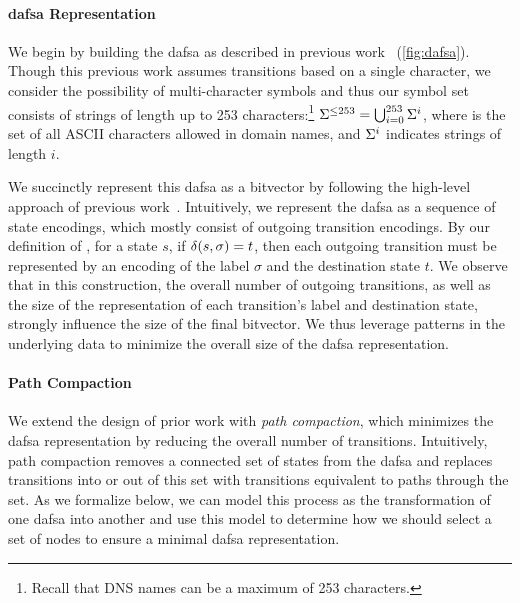 \paragraph{\ac{dafsa} Representation}
We begin by building the \ac{dafsa} as described in previous
work~\cite{daciuk2000incremental} (\autoref{fig:dafsa}). Though this previous work assumes transitions
based on a single character, we consider the possibility of multi-character
symbols and thus our symbol set consists of strings of length up to 253
characters:\footnote{Recall that DNS names can be a maximum of 253 characters.}
$\Sigma^{\le 253} = \bigcup_{i=0}^{253} \Sigma^i$, where \symbols is the set of
all ASCII characters allowed in domain names, and $\Sigma^i$ indicates strings
of length $i$.

We succinctly represent this \ac{dafsa} as a bitvector by following the
high-level approach of previous work~\cite{daciuk2012smaller}. Intuitively, we
represent the \ac{dafsa} as a sequence of state encodings, which mostly consist
of outgoing transition encodings. By our definition of \transfunc, for a state
$s$, if $\delta(s, \sigma) = t$, then each outgoing transition must be
represented by an encoding of the label $\sigma$ and the destination state $t$.
We observe that in this construction, the overall number of outgoing
transitions, as well as the size of the representation of each transition's
label and destination state, strongly influence the size of the final bitvector.
We thus leverage patterns in the underlying data to minimize the
overall size of the \ac{dafsa} representation.

\paragraph{Path Compaction}
We extend the design of prior work with \emph{path compaction}, which
minimizes the \ac{dafsa} representation by reducing the overall number of
transitions. Intuitively, path compaction removes a connected set of states from
the \ac{dafsa} and replaces transitions into or out of this set with transitions
equivalent to paths through the set. As we formalize below, we can model this
process as the transformation of one \ac{dafsa} into another and use this model
to determine how we should select a set of nodes to ensure a minimal \ac{dafsa}
representation.

